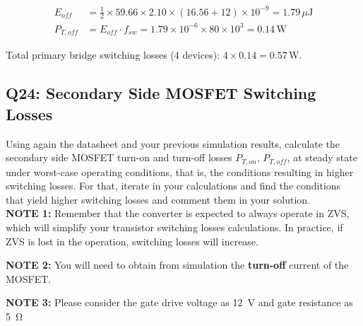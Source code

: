 \documentclass{PELsmallreport}
\begin{document}
\begin{framed}
\begin{align}
    E_{off} &= \frac{1}{2}\times 59.66 \times 2.10 \times (16.56 + 12)\times10^{-9} = 1.79\,\mu\text{J} \\
    P_{T,off} &= E_{off}\cdot f_{sw} = 1.79\times10^{-6}\times 80\times10^3 = 0.14\,\text{W}
\end{align}

Total primary bridge switching losses (4 devices): $4 \times 0.14 = 0.57$\,W.
  \vspace{2em}
\end{framed}

 \quad
{} \quad
\hfill{}

\subsection{Q24: Secondary Side MOSFET Switching Losses} 
Using again the datasheet and your previous simulation results, calculate the secondary side MOSFET turn-on and turn-off losses $P_{T,on}, \,P_{T,off}$, at steady state under worst-case operating conditions, that is, the conditions resulting in higher switching losses. For that, iterate in your calculations and find the conditions that yield higher switching losses and comment them in your solution. \\ 

\textbf{NOTE 1:} Remember that the converter is expected to always operate in ZVS, which will simplify your transistor switching losses calculations. In practice, if ZVS is lost in the operation, switching losses will increase.

\textbf{NOTE 2:} You will need to obtain from simulation the \textbf{turn-off} current of the MOSFET.

\textbf{NOTE 3:} Please consider the gate drive voltage as \SI{12}{\volt} and gate resistance as \SI{5}{\ohm} \\
\end{document}
